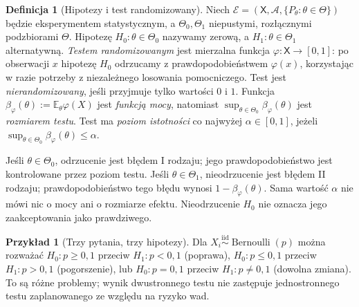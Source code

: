\documentclass[11pt,a4paper,oneside]{report}
\numberwithin{equation}{chapter}
\theoremstyle{plain}
\theoremstyle{definition}
\newtheorem{definicja}{Definicja}[chapter]
\newtheorem{przyklad}{Przykład}[chapter]
\theoremstyle{remark}
\newcommand{\E}{\mathbb E}
\newcommand{\iid}{\mathrel{\overset{\mathrm{iid}}\sim}}
\begin{document}
\begin{definicja}[Hipotezy i test randomizowany]\label{def:statistical-test}
Niech $\mathcal E=(\mathsf X,\mathcal A,\{P_\theta:\theta\in\Theta\})$
będzie eksperymentem statystycznym, a $\Theta_0,\Theta_1$
niepustymi, rozłącznymi podzbiorami $\Theta$.
Hipotezę $H_0:\theta\in\Theta_0$ nazywamy zerową, a
$H_1:\theta\in\Theta_1$ alternatywną. \emph{Testem
randomizowanym} jest mierzalna funkcja
$\varphi:\mathsf X\to[0,1]$: po obserwacji $x$ hipotezę $H_0$
odrzucamy z prawdopodobieństwem $\varphi(x)$, korzystając w razie
potrzeby z niezależnego losowania pomocniczego. Test jest
\emph{nierandomizowany}, jeśli przyjmuje tylko wartości $0$ i $1$.
Funkcja $\beta_\varphi(\theta):=\E_\theta\varphi(X)$ jest
\emph{funkcją mocy}, natomiast
$\sup_{\theta\in\Theta_0}\beta_\varphi(\theta)$ jest
\emph{rozmiarem testu}. Test ma \emph{poziom istotności} co najwyżej
$\alpha\in[0,1]$, jeżeli $\sup_{\theta\in\Theta_0}\beta_\varphi(\theta)
\le\alpha$.
\end{definicja}

Jeśli $\theta\in\Theta_0$, odrzucenie jest błędem I rodzaju; jego
prawdopodobieństwo jest kontrolowane przez poziom testu. Jeśli
$\theta\in\Theta_1$, nieodrzucenie jest błędem II rodzaju;
prawdopodobieństwo tego błędu wynosi $1-\beta_\varphi(\theta)$.
Sama wartość $\alpha$ nie mówi nic o mocy ani o rozmiarze efektu.
Nieodrzucenie $H_0$ nie oznacza jego zaakceptowania jako prawdziwego.

\begin{przyklad}[Trzy pytania, trzy hipotezy]
Dla $X_i\iid\operatorname{Bernoulli}(p)$ można rozważać
$H_0:p\ge 0{,}1$ przeciw $H_1:p<0{,}1$ (poprawa),
$H_0:p\le 0{,}1$ przeciw $H_1:p>0{,}1$ (pogorszenie),
lub $H_0:p=0{,}1$ przeciw $H_1:p\ne0{,}1$ (dowolna zmiana).
To są różne problemy; wynik dwustronnego testu nie zastępuje
jednostronnego testu zaplanowanego ze względu na ryzyko wad.
\end{przyklad}
\end{document}
